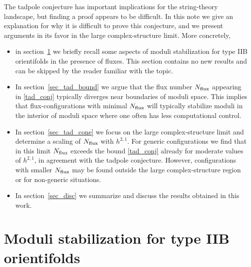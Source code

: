 \documentclass[12pt,a4paper]{article}
\numberwithin{equation}{section}
\begin{document}
The tadpole conjecture has important implications for the string-theory landscape,
but finding a proof  appears to be difficult.
In this note we give an explanation for why it is difficult to prove this conjecture,
and we present arguments in its favor  in the large complex-structure limit. 
More concretely, 
\begin{itemize}

\item in section~\ref{sec_mod_stab} we briefly recall some aspects 
of moduli stabilization for type IIB orientifolds in the presence of fluxes. 
This section contains 
no new results and can be skipped by the reader familiar with
the topic. 


\item In section~\ref{sec_tad_bound} we argue that the 
flux number $N_{\rm flux}$ appearing in \eqref{tad_conj} typically diverges
near boundaries of moduli space. This implies that 
flux-configurations with minimal $N_{\rm flux}$ will typically
stabilize moduli in the interior of moduli space
where one often has less computational control. 


\item In section~\ref{sec_tad_cone} we focus on the large complex-structure limit
and determine a scaling of $N_{\rm flux}$ with $h^{2,1}$. For generic configurations we find
that in this limit $N_{\rm flux}$ exceeds the bound \eqref{tad_conj} already 
for moderate values of $h^{2,1}$, in agreement with the tadpole 
conjecture. However, configurations with smaller $N_{\rm flux}$ may
be found outside the large complex-structure region or for 
non-generic situations. 


\item In section~\ref{sec_disc} we summarize and discuss the results
obtained in this work. 


\end{itemize}









\section{Moduli stabilization for type IIB orientifolds}
\label{sec_mod_stab}
\end{document}
